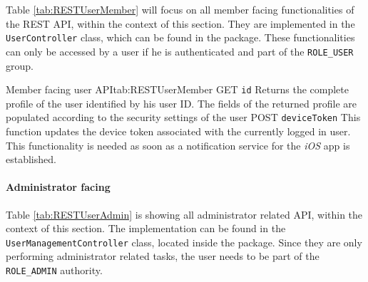 Table \vref{tab:RESTUserMember} will focus on all member facing functionalities of the \gls{REST} \gls{API}, within the context of this section. They are implemented in the \texttt{UserController} class, which can be found in the  package. These functionalities can only be accessed by a user if he is authenticated and part of the \texttt{ROLE\_USER} group.

\begin{RESTTable}{Member facing user API}{tab:RESTUserMember}
		{GET}
		{\texttt{id}}
		{Returns the complete profile of the user identified by his user ID. The fields of the returned profile are populated according to the security settings of the user}
		{POST}
		{\texttt{deviceToken}}
		{This function updates the device token associated with the currently logged in user. This functionality is needed as soon as a notification service for the \emph{iOS} app is established. }
\end{RESTTable}

\paragraph{Administrator facing}

Table \vref{tab:RESTUserAdmin} is showing all administrator related \gls{API}, within the context of this section. The implementation can be found in the \texttt{UserManagementController} class, located inside the  package. Since they are only performing administrator related tasks, the user needs to be part of the \texttt{ROLE\_ADMIN} authority.

